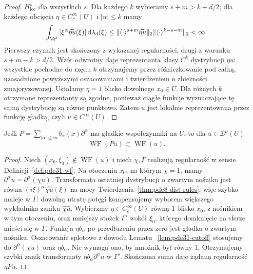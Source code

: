 \begin{proof}
$H^s_{\mathrm{loc}}$ dla wszystkich $s$.
Dla każdego $k$ wybieramy $s+m>k+d/2$;
dla każdego obcięcia $\eta\in C_c^\infty(U)$
i $|\alpha|\le k$ mamy
\[
 \int_{\R^d}|\xi^\alpha\widehat{\eta u}(\xi)|
 \,\mathrm d\lambda_d(\xi)
 \le
 \|\langle\cdot\rangle^{s+m}\widehat{\eta u}\|_2
 \|\langle\cdot\rangle^{k-s-m}\|_2<\infty .
\]
Pierwszy czynnik jest skończony z wykazanej
regularności, drugi z warunku $s+m-k>d/2$.
Wzór odwrotny daje reprezentanta klasy $C^k$
dystrybucji $\eta u$: wszystkie pochodne do
rzędu $k$ otrzymujemy przez różniczkowanie
pod całką, uzasadnione powyższymi oszacowaniami
i twierdzeniem o zbieżności zmajoryzowanej.
Ustalamy $\eta=1$ blisko dowolnego $x_0\in U$.
Dla różnych $k$ otrzymane reprezentanty są
zgodne, ponieważ ciągłe funkcje wyznaczające
tę samą dystrybucję są równe punktowo.
Zatem $u$ jest lokalnie reprezentowana przez
funkcję gładką, czyli $u\in C^\infty(U)$.
\end{proof}

\begin{stwierdzenie}
\label{prop:pde31-differential-wf}
Jeśli $P=\sum_{|\alpha|\le m}b_\alpha(x)\partial^\alpha$
ma gładkie współczynniki na $U$, to dla $u\in\mathcal D'(U)$
\[
 \operatorname{WF}(Pu)\subset\operatorname{WF}(u).
\]
\end{stwierdzenie}
\begin{proof}
Niech $(x_0,\xi_0)\notin\operatorname{WF}(u)$
i niech $\chi,\Gamma$ realizują regularność
w sensie Definicji~\ref{def:pde31-wf}.
Na otoczeniu $x_0$, na którym $\chi=1$,
mamy $\partial^\alpha u=\partial^\alpha(\chi u)$.
Transformata ostatniej dystrybucji o zwartym
nośniku jest równa $(i\xi)^\alpha\widehat{\chi u}(\xi)$
na mocy Twierdzenia~\ref{thm:pde8-dist-rules},
więc szybko maleje w $\Gamma$: dowolną utratę
potęgi kompensujemy wyborem większego wykładnika
zaniku $\widehat{\chi u}$.
Wybierzmy $\eta\in C_c^\infty(U)$ równą $1$
blisko $x_0$, z nośnikiem w tym otoczeniu,
oraz mniejszy stożek $\Gamma'$ wokół $\xi_0$,
którego domknięcie na sferze mieści się w $\Gamma$.
Funkcja $\eta b_\alpha$ po przedłużeniu przez zero
jest gładka o zwartym nośniku.
Oszacowanie splotowe z dowodu Lematu
~\ref{lem:pde31-cutoff} stosujemy do
$\partial^\alpha(\chi u)$ oraz $\eta b_\alpha$.
Nie wymaga ono, by mnożnik był równy $1$.
Otrzymujemy szybki zanik transformaty
$\eta b_\alpha\partial^\alpha u$ w $\Gamma'$.
Skończona suma daje żądaną regularność $\eta Pu$.
\end{proof}

